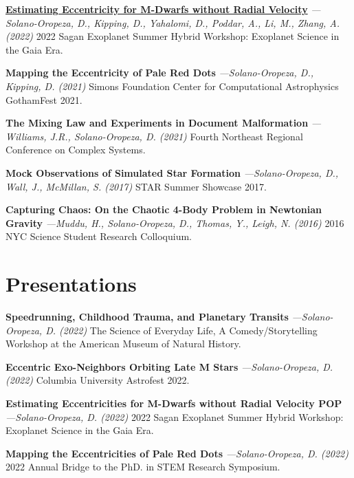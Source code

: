 \documentclass[a4paper,11pt]{article}
\begin{document}
    {\href{https://nexsci.caltech.edu/workshop/2022/posters/finalmaybe_sagan22_eccentricity_poster.pdf}{\textbf{Estimating Eccentricity for M-Dwarfs without Radial Velocity}}} \textit{—Solano-Oropeza, D., Kipping, D., Yahalomi, D., Poddar, A., Li, M., Zhang, A. (2022)} 2022 Sagan Exoplanet Summer Hybrid Workshop: Exoplanet Science in the Gaia Era.
    \vspace{1.5mm}
    
    \textbf{Mapping the Eccentricity of Pale Red Dots} \textit{—Solano-Oropeza, D., Kipping, D. (2021)} Simons Foundation Center for Computational Astrophysics GothamFest 2021.
    \vspace{1.5mm}
    
    \textbf{The Mixing Law and Experiments in Document Malformation} \textit{—Williams, J.R., Solano-Oropeza, D. (2021)} Fourth Northeast Regional Conference on Complex Systems.
    \vspace{1.5mm}
    
    \textbf{Mock Observations of Simulated Star Formation} \textit{—Solano-Oropeza, D., Wall, J., McMillan, S. (2017)} STAR Summer Showcase 2017.
    \vspace{1.5mm}
    
    \textbf{Capturing Chaos: On the Chaotic 4-Body Problem in Newtonian Gravity} \textit{—Muddu, H., Solano-Oropeza, D., Thomas, Y., Leigh, N. (2016)} 2016 NYC Science Student Research Colloquium.
    
\section{Presentations}
    
    \textbf{Speedrunning, Childhood Trauma, and Planetary Transits} \textit{—Solano-Oropeza, D. (2022)} The Science of Everyday Life, A Comedy/Storytelling Workshop at the American Museum of Natural History.
    \vspace{1.5mm}

    \textbf{Eccentric Exo-Neighbors Orbiting Late M Stars} \textit{—Solano-Oropeza, D. (2022)} Columbia University Astrofest 2022.
    \vspace{1.5mm}
    
    \textbf{Estimating Eccentricities for M-Dwarfs without Radial Velocity POP} \textit{—Solano-Oropeza, D. (2022)} 2022 Sagan Exoplanet Summer Hybrid Workshop: Exoplanet Science in the Gaia Era.
    \vspace{1.5mm}

    \textbf{Mapping the Eccentricities of Pale Red Dots} \textit{—Solano-Oropeza, D. (2022)} 2022 Annual Bridge to the PhD. in STEM Research Symposium.
    \vspace{1.5mm}
    
\end{document}
